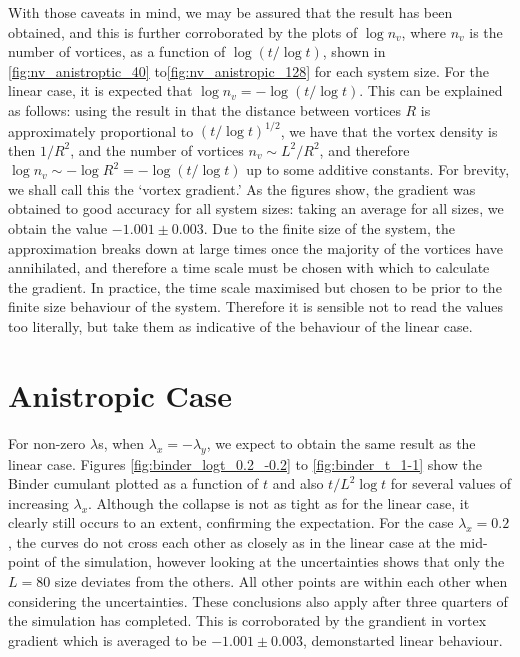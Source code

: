 With those caveats in mind, we may be assured that the result has been obtained, and this is further corroborated by the plots of $\log n_v$, where $n_v$ is the number of vortices, as a function of $\log (t / \log t)$, shown in  \ref{fig:nv_anistroptic_40} to\ref{fig:nv_anistropic_128}  for each system size. 
For the linear case, it is expected that $\log n_v = -\log (t / \log t)$. 
This can be explained as follows: using the result in \cite{PhysRevLett.84.1503} that the distance between vortices $R$ is approximately proportional to $ (t / \log t)^{1/2}$, we have that the vortex density is then $1/R^2$, and the number of vortices $n_v \sim L^2/R^2$, and therefore $\log n_v \sim -  \log R^2 = -\log(t/\log t)$ up to some additive constants. For brevity, we shall call this the `vortex gradient.'
As the figures show, the gradient was obtained to good accuracy for all system sizes: taking an average for all sizes, we obtain the value $-1.001 \pm 0.003$. Due to the finite size of the system, the approximation breaks down at large times once the majority of the vortices have annihilated, and therefore a time scale must be chosen with which to calculate the gradient. 
In practice, the time scale maximised but chosen to be prior to the finite size behaviour of the system. 
Therefore it is sensible not to read the values too literally, but take them as indicative of the behaviour of the linear case.                



\section{Anistropic Case} 
For non-zero $\lambda$s, when $\lambda_x = - \lambda_y$, we expect to obtain the same result as the linear case. Figures \ref{fig:binder_logt_0.2_-0.2} to \ref{fig:binder_t_1-1} show the Binder cumulant plotted as a function of $t$ and also $t/ L^2 \log t$ for several values of increasing $\lambda_x$. Although the collapse is not as tight as for the linear case, it clearly still occurs to an extent, confirming the expectation. For the case $\lambda_x = 0.2$, the curves do not cross each other as closely as in the linear case at the mid-point of the simulation, however looking at the uncertainties shows that only the $L=80$ size deviates from the others. All other points are within each other when considering the uncertainties. These conclusions also apply after three quarters of the simulation has completed. This is corroborated by the grandient in vortex gradient which is averaged to be $-1.001 \pm 0.003$, demonstarted linear behaviour.

